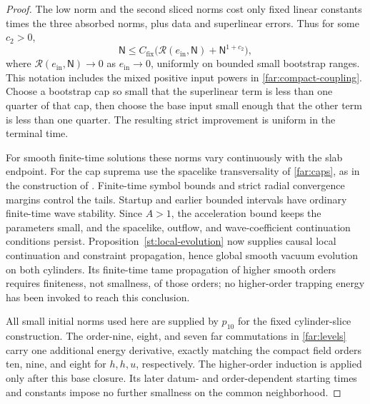 \begin{proof}
The low norm and the second sliced norms cost only fixed linear
constants times the three absorbed norms, plus data and superlinear
errors.  Thus for some $c_2>0$,
\begin{equation}\label{far:total-closure}
 \mathsf N\le C_{\mathrm{fix}}
       \bigl(\mathcal R(e_{\mathrm{in}},\mathsf N)
                          +\mathsf N^{1+c_2}\bigr),
\end{equation}
where $\mathcal R(e_{\mathrm{in}},\mathsf N)\to0$ as
$e_{\mathrm{in}}\to0$, uniformly on bounded small bootstrap ranges.
This notation includes the mixed positive input powers in
\eqref{far:compact-coupling}.
Choose a bootstrap cap so small that the superlinear term is less than
one quarter of that cap, then choose the base input small enough that
the other term is less than one quarter.  The resulting strict
improvement is uniform in the terminal time.

For smooth finite-time solutions these norms vary continuously with the
slab endpoint.  For the cap suprema use the spacelike transversality of
\eqref{far:caps}, as in the construction of .
Finite-time symbol bounds and strict radial convergence margins control
the tails.  Startup and
earlier bounded intervals have ordinary finite-time wave stability.
Since $A>1$, the acceleration bound keeps the parameters small, and the
spacelike, outflow, and wave-coefficient continuation conditions persist.
Proposition~\ref{st:local-evolution} now supplies causal local continuation
and constraint propagation, hence global smooth vacuum evolution on both
cylinders.  Its finite-time tame propagation of higher smooth orders
requires finiteness, not smallness, of those orders; no higher-order
trapping energy has been invoked to reach this conclusion.

All small initial norms used here are supplied by $p_{10}$ for the
fixed cylinder-slice construction.  The order-nine, eight, and seven
far commutations in \eqref{far:levels} carry one additional energy
derivative, exactly matching the compact field orders ten, nine, and
eight for $h,h,u$, respectively.  The higher-order induction is applied only after this base
closure.  Its later datum- and order-dependent starting times and
constants impose no further smallness on the common neighborhood.
\end{proof}
